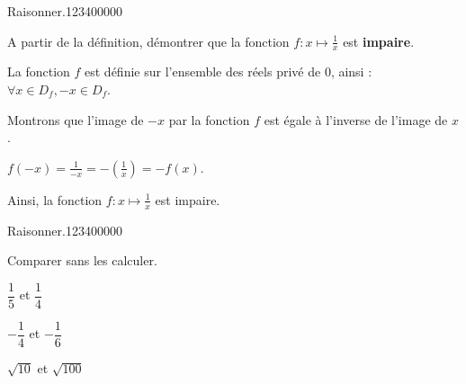 \begin{pageAD}  %
\restoregeometry %


\begin{ExoCad}{Raisonner.}{1234}{0}{0}{0}{0}{0}

A partir de la définition, démontrer que la fonction $f:x\mapsto \frac{1}{x}$ est \textbf{impaire}.


La fonction $f$ est définie sur l'ensemble des réels privé de $0$, ainsi : $\forall x\in D_f,-x\in D_f$.

Montrons que l'image de $-x$ par la fonction $f$ est égale à l'inverse de l'image de $x$.

$f(-x)=\frac{1}{-x}=-(\frac{1}{x})=-f(x)$.

Ainsi, la fonction $f :x\mapsto \frac{1}{x}$ est impaire.

\end{ExoCad} 

\begin{ExoCad}{Raisonner.}{1234}{0}{0}{0}{0}{0}

Comparer sans les calculer.
\begin{description}[leftmargin=*]
\item $\dfrac{1}{5}$ et $\dfrac{1}{4}$  



\item $-\dfrac{1}{4}$ et $-\dfrac{1}{6}$ 



\item $\sqrt{10}$ et $\sqrt{100}$ 



\end{description}
\end{ExoCad}
\end{pageAD}
